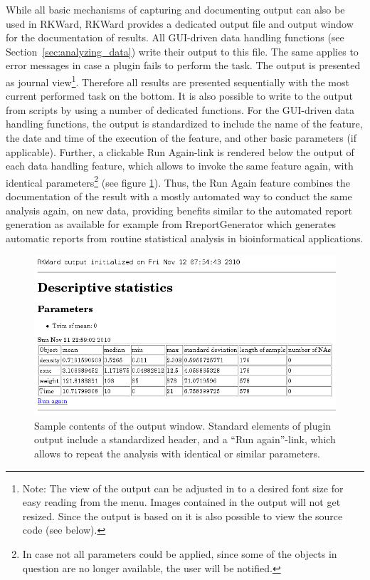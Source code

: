 While all basic mechanisms of
capturing and documenting  output can also
be used in RKWard, RKWard provides a dedicated output file and output
window for the documentation of results. All GUI-driven data handling
functions (see Section~\ref{sec:analyzing_data}) write their output to this file. 
The same applies to error messages in case a plugin fails to perform the task.
The output is presented as journal view\footnote{Note: The view of the output can be adjusted in
to a desired font size for easy reading from the menu. Images contained in the output will not get resized. 
Since the output is based on  it is also possible to view the source code 
(see below).}. Therefore all results are presented
sequentially with the most current performed task on the bottom.
It is also possible to write to the output from 
scripts by using a number of dedicated 
functions. For the GUI-driven data handling functions, the output is
standardized to include the name of the feature, the date and time of
the execution of the feature, and other basic parameters (if
applicable). Further, a clickable Run
Again-link is rendered below the output of each data
handling feature, which allows to invoke the same feature again, with
identical parameters\footnote{In case not all parameters could be
applied, since some of the  objects in
question are no longer available, the user will be notified.} (see
figure \ref{fig:results_output}). Thus, the Run
Again feature combines the documentation of the result
with a mostly automated way to conduct the same analysis again, on new
data, providing benefits similar to the automated report generation as
available for example from RreportGenerator
\citep{RaffelsbergerW2008} which generates automatic
reports from routine statistical analysis in bioinformatical
applications.

\begin{figure}[htp]
 \centering
 \includegraphics[width=15.5cm]{../figures/results_output_cropped.png}
 \caption{Sample contents of the output window. Standard elements of plugin output include
 a standardized header, and a ``Run again''-link, which allows to repeat the analysis with
 identical or similar parameters.}
 \label{fig:results_output}
\end{figure}

